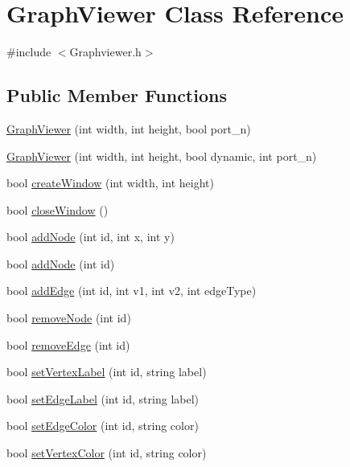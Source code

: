 \hypertarget{classGraphViewer}{\section{Graph\-Viewer Class Reference}
\label{classGraphViewer}
}


{\ttfamily \#include $<$Graphviewer.\-h$>$}

\subsection*{Public Member Functions}
\begin{DoxyCompactItemize}
\item 
\hyperlink{classGraphViewer_aefca44052e0000ef416ddafc828f36cc}{Graph\-Viewer} (int width, int height, bool port\-\_\-n)
\item 
\hyperlink{classGraphViewer_ad9d7b1d8b4ba8ef18517eae0e68568a2}{Graph\-Viewer} (int width, int height, bool dynamic, int port\-\_\-n)
\item 
bool \hyperlink{classGraphViewer_ae5247dc66449dcd21fc5d531bbbaddfa}{create\-Window} (int width, int height)
\item 
bool \hyperlink{classGraphViewer_a85990c1eaac7feed3950960d4bd2fd4c}{close\-Window} ()
\item 
bool \hyperlink{classGraphViewer_a5421e86ac76433876309236ba96e70a2}{add\-Node} (int id, int x, int y)
\item 
bool \hyperlink{classGraphViewer_ab9be856eb5f45284719a3bb119ec01ea}{add\-Node} (int id)
\item 
bool \hyperlink{classGraphViewer_aad0c1448c37f744209ffb671f1bd0015}{add\-Edge} (int id, int v1, int v2, int edge\-Type)
\item 
bool \hyperlink{classGraphViewer_a0c418639bb911eb827cabf895915f775}{remove\-Node} (int id)
\item 
bool \hyperlink{classGraphViewer_a9a8ee68c7c12b373affbe4069dd95d72}{remove\-Edge} (int id)
\item 
bool \hyperlink{classGraphViewer_ac25d7d007022fda16799808ba136e909}{set\-Vertex\-Label} (int id, string label)
\item 
bool \hyperlink{classGraphViewer_a447cca0064e785654c2105602c2961ca}{set\-Edge\-Label} (int id, string label)
\item 
bool \hyperlink{classGraphViewer_a07ccc96707efae4aa5f3ced3dca015af}{set\-Edge\-Color} (int id, string color)
\item 
bool \hyperlink{classGraphViewer_a8b542d7e09e81a45a74760c19233beb0}{set\-Vertex\-Color} (int id, string color)

\end{DoxyCompactItemize}
